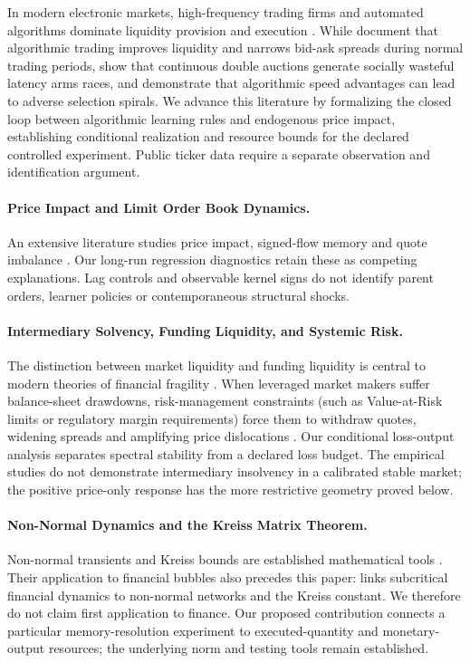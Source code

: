 \documentclass[12pt]{article}
\theoremstyle{definition}
\theoremstyle{remark}
\begin{document}
In modern electronic markets, high-frequency trading firms and automated algorithms dominate liquidity provision and execution \citep{menkveld2013,budish2015,biais2015}. While \citet{hendershott2011does} document that algorithmic trading improves liquidity and narrows bid-ask spreads during normal trading periods, \citet{budish2015} show that continuous double auctions generate socially wasteful latency arms races, and \citet{biais2015} demonstrate that algorithmic speed advantages can lead to adverse selection spirals. We advance this literature by formalizing the closed loop between algorithmic learning rules and endogenous price impact, establishing conditional realization and resource bounds for the declared controlled experiment. Public ticker data require a separate observation and identification argument.

\paragraph{Price Impact and Limit Order Book Dynamics.}
An extensive literature studies price impact, signed-flow memory and quote imbalance \citep{bouchaud2004fluctuations,cont2014}. Our long-run regression diagnostics retain these as competing explanations. Lag controls and observable kernel signs do not identify parent orders, learner policies or contemporaneous structural shocks.

\paragraph{Intermediary Solvency, Funding Liquidity, and Systemic Risk.}
The distinction between market liquidity and funding liquidity is central to modern theories of financial fragility \citep{brunnermeier2009,adrian2010liquidity,he2013intermediary}. When leveraged market makers suffer balance-sheet drawdowns, risk-management constraints (such as Value-at-Risk limits or regulatory margin requirements) force them to withdraw quotes, widening spreads and amplifying price dislocations \citep{greenwood2015vulnerable,eisenberg2001systemic}. Our conditional loss-output analysis separates spectral stability from a declared loss budget. The empirical studies do not demonstrate intermediary insolvency in a calibrated stable market; the positive price-only response has the more restrictive geometry proved below.

\paragraph{Non-Normal Dynamics and the Kreiss Matrix Theorem.}
Non-normal transients and Kreiss bounds are established mathematical tools \citep{kreiss1962,spijker1991,trefethen2005spectra}. Their application to financial bubbles also precedes this paper: \citet{sornette2023nonnormal} links subcritical financial dynamics to non-normal networks and the Kreiss constant. We therefore do not claim first application to finance. Our proposed contribution connects a particular memory-resolution experiment to executed-quantity and monetary-output resources; the underlying norm and testing tools remain established.
\end{document}
